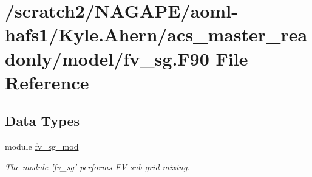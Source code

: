 \section{/scratch2/\-N\-A\-G\-A\-P\-E/aoml-\/hafs1/\-Kyle.Ahern/acs\-\_\-master\-\_\-readonly/model/fv\-\_\-sg.F90 File Reference}
\label{fv__sg_8F90}
\subsection*{Data Types}
\begin{DoxyCompactItemize}
\item 
module \hyperlink{classfv__sg__mod}{fv\-\_\-sg\-\_\-mod}
\begin{DoxyCompactList}\small\item\em The module 'fv\-\_\-sg' performs F\-V sub-\/grid mixing. \end{DoxyCompactList}\end{DoxyCompactItemize}
